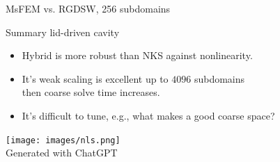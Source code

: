 \begin{frame}{MsFEM vs. RGDSW, 256 subdomains}
	\begin{figure}
		\centering
		
		\label{fig:msfem-vs-rgdsw}
	\end{figure}
\end{frame}

\begin{frame}{Summary lid-driven cavity}
	\begin{itemize}
		\item Hybrid is more robust than NKS against nonlinearity.
		\item It's weak scaling is excellent up to $4096$ subdomains\\then coarse solve time increases. %
		\item It's difficult to tune, e.g., what makes a good coarse space?%
	\end{itemize}

    \begin{center}
        \texttt{[image: images/nls.png]}\\
        {\tiny \vspace{-2mm}\hspace{-4.7cm}Generated with ChatGPT}
    \end{center}
\end{frame}



